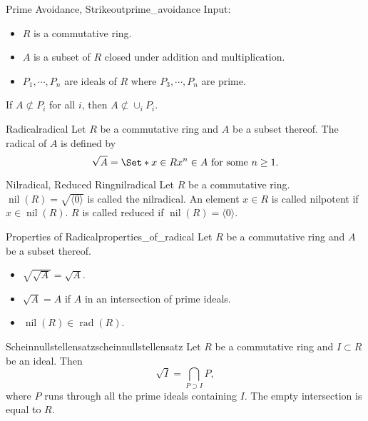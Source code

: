 \documentclass{article}
\begin{document}
\begin{lemma}{Prime Avoidance, Strikeout}{prime_avoidance}
    Input:
    \begin{itemize}
        \item $R$ is a commutative ring.
        \item $A$ is a subset of $R$ closed under addition and multiplication.
        \item $P_1,\cdots,P_n$ are ideals of $R$ where $P_3,\cdots,P_n$ are prime.
    \end{itemize}
    If $A\not\subset P_i$ for all $i$, then $A\not\subset \cup_i P_i$.
\end{lemma}

\begin{definition}{Radical}{radical}
    Let $R$ be a commutative ring and $A$ be a subset thereof.
    The radical of $A$ is defined by
    \[ \sqrt{A} = \Set*{x\in R}{x^n\in A \text{ for some } n\ge 1}. \]
\end{definition}

\begin{definition}{Nilradical, Reduced Ring}{nilradical}
    Let $R$ be a commutative ring.
    $\operatorname{nil}(R) = \sqrt{\langle 0 \rangle}$ is called the nilradical.
    An element $x\in R$ is called nilpotent if $x\in \operatorname{nil}(R)$.
    $R$ is called reduced if $\operatorname{nil}(R) = \langle 0 \rangle$.
\end{definition}

\begin{proposition}{Properties of Radical}{properties_of_radical}
    Let $R$ be a commutative ring and $A$ be a subset thereof.
    \begin{itemize}
        \item $\sqrt{\sqrt{A}} = \sqrt{A}$.
        \item $\sqrt{A} = A$ if $A$ in an intersection of prime ideals.
        \item $\operatorname{nil}(R) \in \operatorname{rad}(R)$.
    \end{itemize}
\end{proposition}

\begin{theorem}{Scheinnullstellensatz}{scheinnullstellensatz}
    Let $R$ be a commutative ring and $I\subset R$ be an ideal. Then
    \[ \sqrt{I} = \bigcap_{P\supset I} P, \]
    where $P$ runs through all the prime ideals containing $I$.
    The empty intersection is equal to $R$.
\end{theorem}
\end{document}
